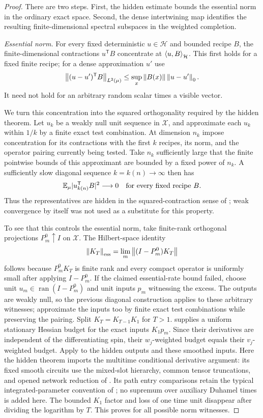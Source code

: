 \begin{proof}
There are two steps.  First, the hidden estimate bounds the essential
norm in the ordinary exact space.  Second, the dense intertwining map
identifies the resulting finite-dimensional spectral subspaces in the
weighted completion.

\emph{Essential norm.}
For every fixed deterministic $u\in\mathcal H$ and bounded recipe $B$,
the finite-dimensional contractions $u^{\mathsf T}B$ concentrate at
$\left\langle u,B\right\rangle_{\mathcal H}$.  This first holds for a fixed finite recipe;
for a dense approximation $u'$ use
\[
 \left\lVert (u-u')^{\mathsf T}B\right\rVert_{L^2(\mu)}
 \le\sup_x\left\lVert B(x)\right\rVert\left\lVert u-u'\right\rVert_0.
\]
It need not hold for an arbitrary random scalar times a visible vector.

We turn this concentration into the squared orthogonality required by
the hidden theorem.  Let $u_k$ be a weakly null unit sequence in
$\mathcal X$, and approximate each $u_k$ within $1/k$ by a finite exact
test combination.
At dimension $n_k$ impose concentration for its contractions with the
first $k$ recipes, its norm, and the operator pairing currently being
tested.  Take $n_k$ sufficiently large that the finite pointwise bounds
of this approximant are bounded by a fixed power of $n_k$.  A sufficiently
slow diagonal sequence $k=k(n)\to\infty$ then has
\[
 \mathbb E_\mu|u_{k(n)}^{\mathsf T}B|^2\longrightarrow0
 \quad\text{for every fixed recipe }B.
\]
Thus the representatives are hidden in the squared-contraction sense of
; weak convergence by itself was not used
as a substitute for this property.

To see that this controls the essential norm, take finite-rank
orthogonal projections $P_m^0\uparrow I$ on $\mathcal X$.  The Hilbert-space
identity
\[
 \left\lVert K_T\right\rVert_{\rm ess}=\lim_m\left\lVert (I-P_m^0)K_T\right\rVert
\]
follows because $P_m^0K_T$ is finite rank and every compact operator is
uniformly small after applying $I-P_m^0$.  If the claimed essential-rate
bound failed, choose unit $u_m\in\operatorname{ran}(I-P_m^0)$ and unit
inputs $p_m$ witnessing the excess.  The outputs are weakly null, so the
previous diagonal construction applies to these arbitrary witnesses;
approximate the inputs too by finite exact test combinations while
preserving the pairing.  Split $K_T=K_{T-1}K_1$ for $T>1$.
 supplies a uniform stationary Hessian budget
for the exact inputs $K_1p_m$.  Since their derivatives are independent
of the differentiating spin, their $w_j$-weighted budget equals their
$v_j$-weighted budget.  Apply  to the hidden
outputs and these smoothed inputs.  Here the hidden theorem imports the
multitime conditional derivative argument: its fixed smooth circuits
use the mixed-slot hierarchy, common tensor truncations, and opened
network reduction of
.
Its path entry comparisons retain the typical integrated-parameter
convention of ; no supremum over auxiliary
Duhamel times is added here.  The bounded $K_1$ factor and loss of one
time unit disappear after dividing the logarithm by $T$.
This proves  for all possible norm
witnesses.


\end{proof}
